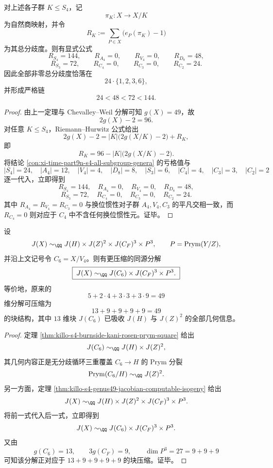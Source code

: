 \begin{conclusion}\label{con:xi-time-part9n-s4-total-ramification-spectrum}
对上述各子群 \(K\le S_4\)，记
\[
\pi_K:X\to X/K
\]
为自然商映射，并令
\[
R_K:=\sum_{P\in X}\bigl(e_P(\pi_K)-1\bigr)
\]
为其总分歧度。则有显式公式
\[
R_{S_4}=144,\qquad
R_{A_4}=0,\qquad
R_{V_4}=0,\qquad
R_{D_8}=48,
\]
\[
R_{S_3}=72,\qquad
R_{C_4}=0,\qquad
R_{C_3}=0,\qquad
R_{C_2}=24.
\]
因此全部非零总分歧度恰落在
\[
24\cdot\{1,2,3,6\},
\]
并形成严格链
\[
24<48<72<144.
\]
\end{conclusion}
\begin{proof}
由上一定理与 Chevalley--Weil 分解可知 \(g(X)=49\)，故
\[
2g(X)-2=96.
\]
对任意 \(K\le S_4\)，Riemann--Hurwitz 公式给出
\[
2g(X)-2=|K|\bigl(2g(X/K)-2\bigr)+R_K,
\]
即
\[
R_K=96-|K|\bigl(2g(X/K)-2\bigr).
\]
将结论 \ref{con:xi-time-part9n-s4-all-subgroup-genera} 的亏格值与
\[
|S_4|=24,\quad |A_4|=12,\quad |V_4|=4,\quad |D_8|=8,\quad
|S_3|=6,\quad |C_4|=4,\quad |C_3|=3,\quad |C_2|=2
\]
逐一代入，立即得到
\[
R_{S_4}=144,\quad R_{A_4}=0,\quad R_{V_4}=0,\quad R_{D_8}=48,
\]
\[
R_{S_3}=72,\quad R_{C_4}=0,\quad R_{C_3}=0,\quad R_{C_2}=24.
\]
其中 \(R_{A_4}=R_{V_4}=R_{C_3}=0\) 与换位惯性对子群 \(A_4,V_4,C_3\) 的平凡交相一致，而 \(R_{C_4}=0\) 则对应于 \(C_4\) 中不含任何换位惯性元。证毕。
\end{proof}

\begin{conclusion}\label{con:xi-time-part9n-jacobian-c6-compression}
设
\[
J(X)\sim_{\QQ}J(H)\times J(Z)^2\times J(C_F)^3\times P^3,
\qquad
P=\operatorname{Prym}(Y/Z),
\]
并沿上文记号令 \(C_6=X/V_4\)。则有更压缩的同源分解
\[
\boxed{\;
J(X)\sim_{\QQ} J(C_6)\times J(C_F)^3\times P^3.
\;}
\]
等价地，原来的
\[
5+2\cdot 4+3\cdot 3+3\cdot 9=49
\]
维分解可压缩为
\[
13+9+9+9+9=49
\]
的块结构，其中 \(13\) 维块 \(J(C_6)\) 已吸收 \(J(H)\) 与 \(J(Z)^2\) 的全部几何信息。
\end{conclusion}
\begin{proof}
定理 \ref{thm:killo-s4-burnside-kani-rosen-prym-square} 给出
\[
J(C_6)\sim_{\QQ}J(H)\times J(Z)^2,
\]
其几何内容正是无分歧循环三重覆盖 \(C_6\to H\) 的 Prym 分裂
\[
\operatorname{Prym}(C_6/H)\sim_{\QQ}J(Z)^2.
\]
另一方面，定理 \ref{thm:killo-s4-genus49-jacobian-computable-isogeny} 给出
\[
J(X)\sim_{\QQ}J(H)\times J(Z)^2\times J(C_F)^3\times P^3.
\]
将前一式代入后一式，立即得到
\[
J(X)\sim_{\QQ}J(C_6)\times J(C_F)^3\times P^3.
\]
又由
\[
g(C_6)=13,\qquad 3g(C_F)=9,\qquad \dim P^3=27=9+9+9
\]
可知该分解正对应于 \(13+9+9+9+9\) 的块压缩。证毕。
\end{proof}

